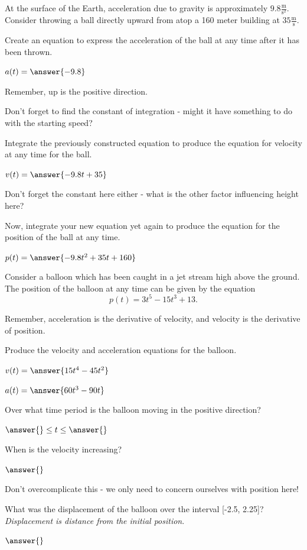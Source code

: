 \documentclass{ximera}
\begin{document}
\begin{question}
At the surface of the Earth, acceleration due to gravity is approximately $9.8 \frac{\text{m}}{\text{s}^2}$. Consider throwing a ball directly upward from atop a 160 meter building at $35 \frac{\text{m}}{\text{s}}$.

Create an equation to express the acceleration of the ball at any time after it has been thrown.

$a(t) = \answer{-9.8}$
\begin{feedback}
Remember, up is the positive direction.
\end{feedback}

\begin{hint}
Don't forget to find the constant of integration - might it have something to do with the starting speed?
\end{hint}
Integrate the previously constructed equation to produce the equation for velocity at any time for the ball.

$v(t) = \answer{-9.8t+35}$

\begin{hint}
Don't forget the constant here either - what is the other factor influencing height here?
\end{hint}
Now, integrate your new equation yet again to produce the equation for the position of the ball at any time.

$p(t) = \answer{-9.8t^2+35t+160}$
\end{question}
\begin{question}
Consider a balloon which has been caught in a jet stream high above the ground. The position of the balloon at any time can be given by the equation $$p(t) = 3t^5-15t^3+13\text{.}$$

\begin{hint}
Remember, acceleration is the derivative of velocity, and velocity is the derivative of position.
\end{hint}
Produce the velocity and acceleration equations for the balloon.

$v(t) = \answer{15t^4-45t^2}$

$a(t) = \answer{60t^3-90t}$

Over what time period is the balloon moving in the positive direction?

$\answer{} \leq t \leq \answer{}$

When is the velocity increasing?

$\answer{}$

\begin{hint}
Don't overcomplicate this - we only need to concern ourselves with position here!
\end{hint}
What was the displacement of the balloon over the interval [-2.5, 2.25]? \textit{Displacement is distance from the initial position}.

$\answer{}$
\end{question}
\end{document}
